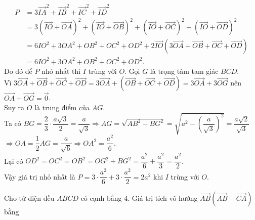 \begin{ex}
{\begin{enumerate}[a)]
	\begin{align*}
	P& =3\vec{IA}^2+\vec{IB}^2+\vec{IC}^2+\vec{ID}^2 \\
	& =3\left(\vec{IO}+\vec{OA}\right)^2+\left(\vec{IO}+\vec{OB}\right)^2+\left(\vec{IO}+\vec{OC}\right)^2+\left(\vec{IO}+\vec{OD}\right)^2 \\
	& =6IO^2+3OA^2+OB^2+OC^2+OD^2+2\vec{IO}\left(3\vec{OA}+\vec{OB}+\vec{OC}+\vec{OD}\right) \\
	& =6IO^2+3OA^2+OB^2+OC^2+OD^2.
	\end{align*}
	Do đó để $P$ nhỏ nhất thì $I$ trùng với $O$. Gọi $G$ là trọng tâm tam giác $BCD$.\\
	Vì $3\vec{OA}+\vec{OB}+\vec{OC}+\vec{OD}=3\vec{OA}+\left(\vec{OB}+\vec{OC}+\vec{OD}\right) =3\vec{OA}+3\vec{OG}$ nên $\vec{OA}+\vec{OG}=\vec{0}$.\\	
	Suy ra $O$ là trung điểm của $AG$.\\
	Ta có $BG=\dfrac{2}{3} \cdot \dfrac{a\sqrt{3}}{2}=\dfrac{a}{\sqrt{3}}\Rightarrow AG=\sqrt{AB^2-BG^2}=\sqrt{a^2-{{\left(\dfrac{a}{\sqrt{3}}\right)}^2}}=\dfrac{a\sqrt{2}}{\sqrt{3}}$\\
	$\Rightarrow OA=\dfrac{1}{2}AG=\dfrac{a}{\sqrt{6}}\Rightarrow OA^2=\dfrac{a^2}{6}$.\\
	Lại có $OD^2=OC^2=OB^2=OG^2+BG^2=\dfrac{a^2}{6}+\dfrac{a^2}{3}=\dfrac{a^2}{2}$.\\
	Vậy giá trị nhỏ nhất là $P=3 \cdot \dfrac{a^2}{6}+3 \cdot \dfrac{a^2}{2}=2a^2$ khi $I$ trùng với $O$.
	\end{enumerate}
	}
\end{ex}
\TNSA
\begin{ex}
	Cho tứ diện đều $ABCD$ có cạnh bằng $4$. Giá trị tích vô hướng $\vec{AB}\left(\vec{AB}-\vec{CA}\right)$ bằng
\end{ex}
